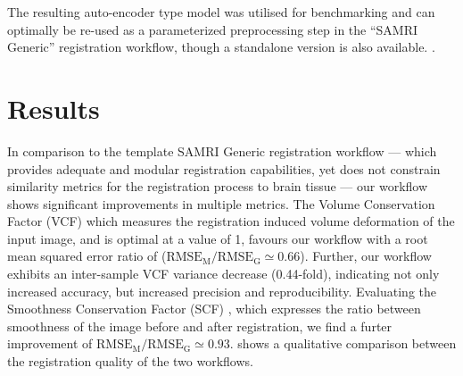 \documentclass[11pt, english]{article}
\begin{document}
    The resulting auto-encoder type model was utilised for benchmarking and can optimally be re-used as a parameterized preprocessing step in the “SAMRI Generic” \citet{ioanas_optimized_2019} registration workflow, though a standalone version is also available.
    \citep{irsabi_bidsdata}.


    \section{Results}
    In comparison to the template SAMRI Generic registration workflow --- which provides adequate and modular registration capabilities, yet does not constrain similarity metrics for the registration process to brain tissue --- our workflow shows significant improvements in multiple metrics.
    The Volume Conservation Factor (VCF) \citep{ioanas_optimized_2019} which measures the registration induced volume deformation of the input image, and is optimal at a value of 1, favours our workflow with a root mean squared error ratio of ($\mathrm{RMSE_{M}/RMSE_{G}\simeq} 0.66$).
    Further, our workflow exhibits an inter-sample VCF variance decrease (0.44-fold), indicating not only increased accuracy, but increased precision and reproducibility.
    Evaluating the Smoothness Conservation Factor (SCF) \citep{ioanas_optimized_2019}, which expresses the ratio between smoothness of the image before and after registration, we find a furter improvement of $\mathrm{RMSE_{M}/RMSE_{G}\simeq} 0.93$.
     shows a qualitative comparison between the registration quality of the two workflows.


    \begin{sansmath}
    \end{sansmath}
\end{document}
